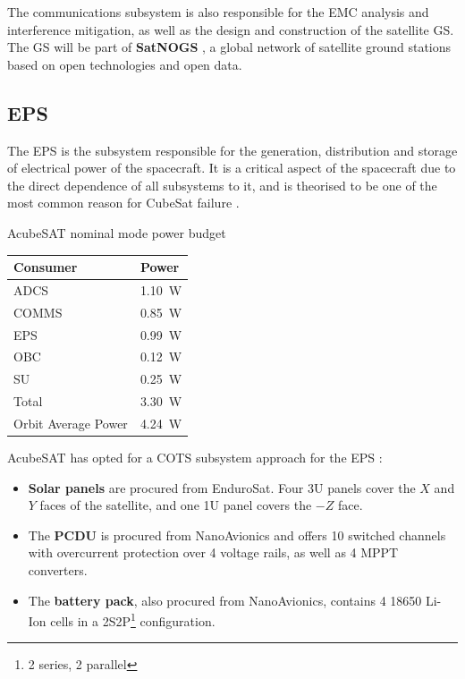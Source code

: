 \documentclass[a4paper,nobib]{tufte-book}
\begin{document}
The communications subsystem is also responsible for the \ac{EMC} analysis and interference mitigation, as well as the design and construction of the satellite \acl{GS}. The \acl{GS} will be part of \textbf{SatNOGS} \autocite{white_overview_satellite_2018}, a global network of satellite ground stations based on open technologies and open data.

\subsection{\acf{EPS}}
The \ac{EPS} is the subsystem responsible for the generation, distribution and storage of electrical power of the spacecraft. It is a critical aspect of the spacecraft due to the direct dependence of all subsystems to it, and is theorised to be one of the most common reason for CubeSat failure \autocite{langer_reliability_cubesats_2016,bouwmeester_survey_implementation_2017}.

\begin{margintable}
	\caption{AcubeSAT nominal mode power budget}
	\label{tab:power_budget}
	\begin{tabularx}{\linewidth}{@{}lX@{}}
		\toprule
		\textbf{Consumer}            & \textbf{Power}            \\ \midrule
		\acs{ADCS}          & \SI{1.10}{\watt} \\
		\acs{COMMS}         & \SI{0.85}{\watt} \\
		\acs{EPS}           & \SI{0.99}{\watt} \\
		\acs{OBC}           & \SI{0.12}{\watt} \\
		\acs{SU}            & \SI{0.25}{\watt} \\ \midrule
		Total               & \SI{3.30}{\watt} \\
		Orbit Average Power & \SI{4.24}{\watt} \\ \bottomrule
	\end{tabularx}
\end{margintable}

AcubeSAT has opted for a \ac{COTS} subsystem approach for the \ac{EPS} \autocite{DDJF_SYS}:
\begin{itemize}
	\item \textbf{Solar panels} are procured from EnduroSat. Four 3U panels cover the \(X\) and \(Y\) faces of the satellite, and one 1U panel covers the \(-Z\) face.
	\item The \textbf{\ac{PCDU}} is procured from NanoAvionics and offers 10 switched channels with overcurrent protection over 4 voltage rails, as well as 4 \ac{MPPT} converters.
	\item The \textbf{battery pack}, also procured from NanoAvionics, contains 4 18650 Li-Ion cells in a 2S2P\footnote{2 series, 2 parallel} configuration.
\end{itemize}
\end{document}
